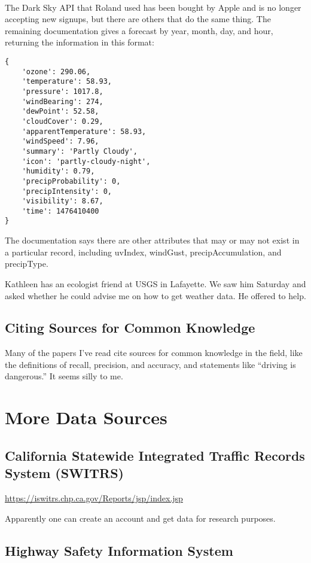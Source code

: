\documentclass[11pt]{article}
\begin{document}
\begin{spacing}{1.2}
\

The Dark Sky API that Roland used has been bought by Apple and is no longer accepting new signups, but there are others that do the same thing.  The remaining documentation gives a forecast by year, month, day, and hour, returning the information in this format:

\begin{verbatim}
{
	'ozone': 290.06, 
	'temperature': 58.93, 
	'pressure': 1017.8, 
	'windBearing': 274, 
	'dewPoint': 52.58, 
	'cloudCover': 0.29, 
	'apparentTemperature': 58.93, 
	'windSpeed': 7.96, 
	'summary': 'Partly Cloudy', 
	'icon': 'partly-cloudy-night', 
	'humidity': 0.79, 
	'precipProbability': 0, 
	'precipIntensity': 0, 
	'visibility': 8.67, 
	'time': 1476410400
}
\end{verbatim}

The documentation says there are other attributes that may or may not exist in a particular record, including uvIndex, windGust, precipAccumulation, and precipType.  

Kathleen has an ecologist friend at USGS in Lafayette.  We saw him Saturday and asked whether he could advise me on how to get weather data.  He offered to help.  


\subsection{Citing Sources for Common Knowledge}

Many of the papers I've read cite sources for common knowledge in the field, like the definitions of recall, precision, and accuracy, and statements like ``driving is dangerous.''  It seems silly to me.  

\section{More Data Sources}
\subsection{California Statewide Integrated Traffic Records System (SWITRS)}

\url{https://iswitrs.chp.ca.gov/Reports/jsp/index.jsp}

Apparently one can create an account and get data for research purposes.  

\subsection{Highway Safety Information System}


\end{spacing}
\end{document}
